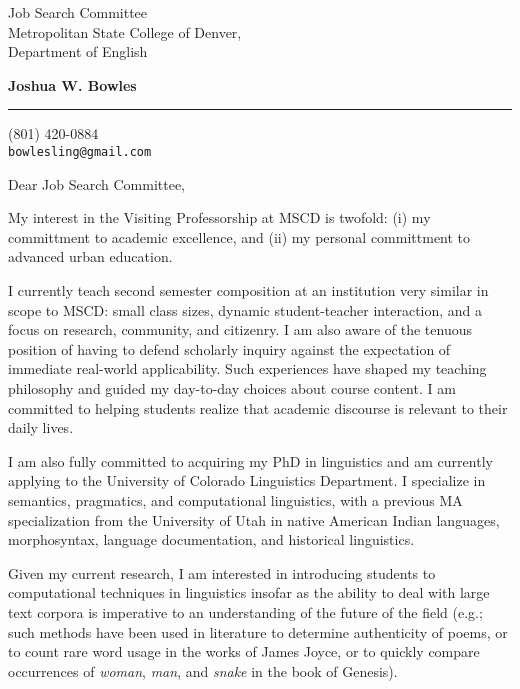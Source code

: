 \documentclass{letter} %
\begin{document}
\signature{Joshua W. Bowles}           %
\longindentation=0pt                       %
\let\raggedleft\raggedright                %
 
 
\begin{letter}{Job Search Committee \\
Metropolitan State College of Denver, \\
Department of English}


\begin{flushleft}
{\large\bf Joshua W. Bowles}
\end{flushleft}
\medskip\hrule height 1pt
\begin{flushright}
\hfill (801) 420-0884\\ 
\hfill \texttt{bowlesling@gmail.com}\\ 
\end{flushright} 
\vfill %

 
\opening{Dear Job Search Committee,} 
 
\noindent My interest in the Visiting Professorship at MSCD is twofold: (i) my committment to academic excellence, and (ii) my personal committment to advanced urban education. 

\noindent I currently teach second semester composition at an institution very similar in scope to MSCD: small class sizes, dynamic student-teacher interaction, and a focus on research, community, and citizenry. I am also aware of the tenuous position of having to defend scholarly inquiry against the expectation of immediate real-world applicability. Such experiences have shaped my teaching philosophy and guided my day-to-day choices about course content. I am committed to helping students realize that academic discourse is relevant to their daily lives.  

\noindent I am also fully committed to acquiring my PhD in linguistics and am currently applying to the University of Colorado Linguistics Department. I specialize in semantics, pragmatics, and computational linguistics, with a previous MA specialization from the University of Utah in native American Indian languages, morphosyntax, language documentation, and historical linguistics.

\noindent Given my current research, I am interested in introducing students to computational techniques in linguistics insofar as the ability to deal with large text corpora is imperative to an understanding of the future of the field (e.g.; such methods have been used in literature to determine authenticity of poems, or to count rare word usage in the works of James Joyce, or to quickly compare occurrences of {\sl woman}, {\sl man}, and {\sl snake} in the book of Genesis). 


\end{letter}
\end{document}
